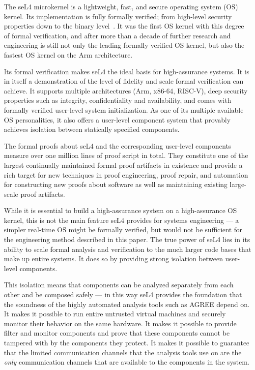 
The seL4 microkernel is a lightweight, fast, and secure operating system (OS) kernel.
Its implementation is fully formally verified; from high-level security properties
down to the binary level~\cite{sel4-formal}. It was the first OS kernel with this
degree of formal verification, and after more than a decade of further research
and engineering is still not only the leading formally verified OS kernel, but also
the fastest OS kernel on the Arm architecture.

Its formal verification makes seL4 the ideal basis for high-assurance systems.
It is in itself a demonstration of the level of fidelity and scale formal
verification can achieve. It supports multiple architectures (Arm, x86-64,
RISC-V), deep security properties such as integrity, confidentiality and
availability, and comes with formally verified user-level system initialization.
As one of its multiple available OS personalities, it also offers a user-level component
system that provably achieves isolation between statically specified components.

The formal proofs about seL4 and the corresponding user-level components measure
over one million lines of proof script in total. They constitute one of the
largest continually maintained formal proof artifacts in existence and provide a
rich target for new techniques in proof engineering, proof repair, and
automation for constructing new proofs about software as well as maintaining
existing large-scale proof artifacts.

While it is essential to build a high-assurance system on a high-assurance OS
kernel, this is not the main feature seL4 provides for systems engineering --- a
simpler real-time OS might be formally verified, but would not be sufficient for the
engineering method described in this paper. The true power of seL4 lies in its
ability to scale formal analysis and verification to the much larger code bases
that make up entire systems. It does so by providing strong isolation between
user-level components.

This isolation means that components can be analyzed separately from each other
and be composed safely --- in this way seL4 provides the foundation that the soundness of the highly
automated analysis tools such as AGREE depend on. It makes it possible to run
entire untrusted virtual machines and securely monitor their behavior on the
same hardware. It makes it possible to provide filter and monitor components and
prove that these components cannot be tampered with by the components they protect.
It makes it possible to guarantee that the limited communication channels that the analysis tools
use on are the \emph{only} communication channels that are available to the
components in the system.
